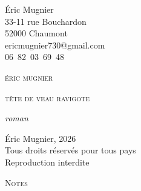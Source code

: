 \documentclass[12pt,a4paper,twoside,openright]{memoir}
\makeatletter
\renewcommand{\cleardoublepage}{%
  \clearpage
  \if@twoside
    \ifodd\c@page\else
      \hbox{}\thispagestyle{empty}\newpage
    \fi
  \fi
}
\makeatother
\begin{document}
\pagestyle{empty}

\noindent
Éric Mugnier\\
33-11 rue Bouchardon\\
52000 Chaumont\\
ericmugnier730@gmail.com\\
06~82~03~69~48

\cleardoublepage

\begin{center}
\vspace*{6\onelineskip}
{\scshape\large éric mugnier}

\vspace{8\onelineskip}
{\scshape\huge tête de veau ravigote}

\vspace{12\onelineskip}
{\itshape roman}
\end{center}
\newpage
\thispagestyle{empty}
\vspace*{\fill}
{\footnotesize\noindent
\textcopyright{} Éric Mugnier, 2026\\
Tous droits réservés pour tous pays\\
Reproduction interdite
}
\cleardoublepage

\vspace*{10\onelineskip}
\begin{flushright}
\itshape\small
\end{flushright}
\cleardoublepage

\pagestyle{gallimard}

{\makeatletter\def\contentsline#1#2#3#4{}\makeatother}



\ifdefined\AVECNOTES
  \ifdefined\SANSNOTESFINALES\else
    \cleardoublepage
    \thispagestyle{empty}
    \vspace*{10\onelineskip}
    {\centering\normalfont\scshape\large Notes\par}
    \newpage
    \hbox{}\thispagestyle{empty}
    \newpage
    \pagestyle{gallimard}
    \theendnotes
  \fi
\fi


\end{document}
